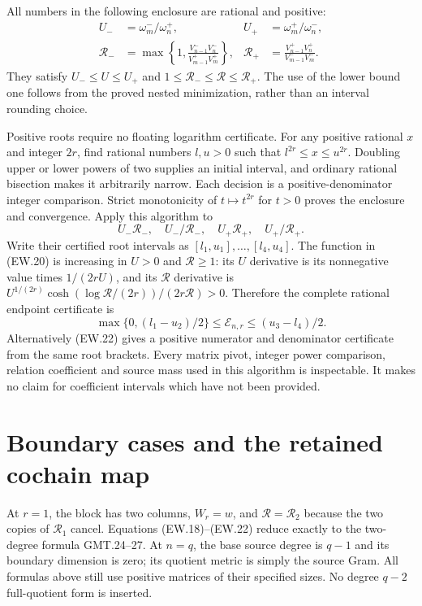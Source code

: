\documentclass[11pt]{article}
\begin{document}
All numbers in the following enclosure are rational and positive:
\[
 \begin{aligned}
 U_-&=\omega_m^-/\omega_n^+,&
 U_+&=\omega_m^+/\omega_n^-,\\
 \mathscr R_-&=\max\left\{1,
 \frac{V_{n-1}^-V_n^-}{V_{m-1}^+V_m^+}\right\},&
 \mathscr R_+&=\frac{V_{n-1}^+V_n^+}{V_{m-1}^-V_m^-}.
 \end{aligned}                                                 \tag{EW.44}
\]
They satisfy $U_-\le U\le U_+$ and
$1\le\mathscr R_-\le\mathscr R\le\mathscr R_+$.
The use of the lower bound one follows from the proved nested
minimization, rather than an interval rounding choice.

Positive roots require no floating logarithm certificate. For any
positive rational $x$ and integer $2r$, find rational numbers
$l,u>0$ such that $l^{2r}\le x\le u^{2r}$. Doubling upper
or lower powers of two supplies an initial interval, and ordinary
rational bisection makes it arbitrarily narrow. Each decision is a
positive-denominator integer comparison. Strict monotonicity of
$t\mapsto t^{2r}$ for $t>0$ proves the enclosure and convergence.
Apply this algorithm to
\[
 U_-\mathscr R_-,\quad U_-/\mathscr R_-,\quad
 U_+\mathscr R_+,\quad U_+/\mathscr R_+.
\]
Write their certified root intervals as $[l_1,u_1],\ldots,[l_4,u_4]$.
The function in (EW.20) is increasing in $U>0$ and
$\mathscr R\ge1$: its $U$ derivative is its nonnegative value
times $1/(2rU)$, and its $\mathscr R$ derivative is
$U^{1/(2r)}\cosh(\log\mathscr R/(2r))/(2r\mathscr R)>0$.
Therefore the complete rational endpoint certificate is
\[
 \boxed{\max\{0,(l_1-u_2)/2\}
             \le\mathcal E_{n,r}\le(u_3-l_4)/2.}             \tag{EW.45}
\]
Alternatively (EW.22) gives a positive numerator and denominator
certificate from the same root brackets. Every matrix pivot, integer
power comparison, relation coefficient and source mass used in this
algorithm is inspectable. It makes no claim for coefficient intervals
which have not been provided.

\section{Boundary cases and the retained cochain map}

At $r=1$, the block has two columns, $W_r=w$, and
$\mathscr R=\mathscr R_2$ because the two copies of
$\mathscr R_1$ cancel. Equations (EW.18)--(EW.22) reduce exactly
to the two-degree formula GMT.24--27. At $n=q$, the base source
degree is $q-1$ and its boundary dimension is zero; its quotient
metric is simply the source Gram. All formulas above still use
positive matrices of their specified sizes. No degree $q-2$
full-quotient form is inserted.
\end{document}
